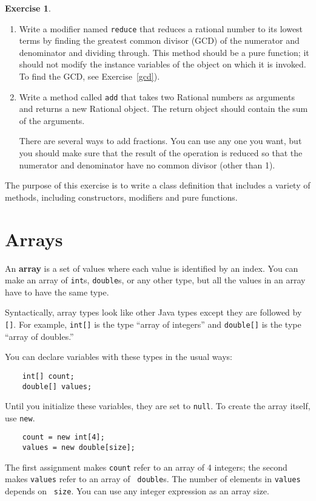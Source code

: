 \documentclass[12pt]{book}
\theoremstyle{definition}
\newtheorem{excz}{Exercise}[chapter]
\newenvironment{exercise}{\bigskip\begin{excz}\mbox{}}{\end{excz}}
\begin{document}
\begin{exercise}
\begin{enumerate}
\item Write a modifier named {\tt reduce} that reduces a rational
  number to its lowest terms by finding the greatest common divisor
  (GCD) of the numerator and denominator and dividing through.
  This method should be a pure function; it should
  not modify the instance variables of the object on which it is
  invoked.  To find the GCD, see Exercise~\ref{gcd}).

\item Write a method called {\tt add} that takes two Rational
numbers as arguments and returns a new Rational object.  The return
object should contain the sum of the arguments.

There are several ways to add fractions.  You can use any one you
want, but you should make sure that the result of the operation is
reduced so that the numerator and denominator have no common divisor
(other than 1).
\end{enumerate}

The purpose of this exercise is to write a class definition that
includes a variety of methods, including constructors, modifiers and
pure functions.
\end{exercise}




\chapter{Arrays}
\label{chap10}
\label{arrays}

An {\bf array} is a set of values where each value is identified by an
index.  You can make an array of {\tt int}s, {\tt double}s, or any
other type, but all the values in an array have to have the same type.

Syntactically, array types look like other Java types except they are
followed by {\tt []}.  For example, {\tt int[]} is the type ``array of
integers'' and {\tt double[]} is the type ``array of doubles.''

You can declare variables with these types in the usual ways:

\begin{lstlisting}
    int[] count;
    double[] values;
\end{lstlisting}
%
Until you initialize these variables, they are set to {\tt null}.
To create the array itself, use {\tt new}.

\begin{lstlisting}
    count = new int[4];
    values = new double[size];
\end{lstlisting}
%
The first assignment makes {\tt count} refer to an array of 4
integers; the second makes {\tt values} refer to an array of {\tt
double}s.  The number of elements in {\tt values} depends on {\tt
size}.  You can use any integer expression as an array
size.
\end{document}
